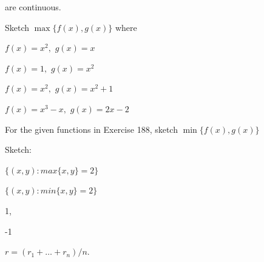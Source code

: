 \documentclass[11pt]{amsbook}
\begin{document}
\begin{hEnumerateArabic}
        are continuous.
        
        \item{ Sketch $\max{\{ f(x), g(x) \}}$ where}
        
            \begin{hEnumerateAlpha}
                \begin{multicols}{2}
                    \item $f(x) = x^2 ,$ $ g(x) = x$
                \columnbreak
                    \item $f(x) = 1 ,$ $ g(x) = x^2$
                \end{multicols}

                \begin{multicols}{2}
                    \item $f(x) = x^2 ,$ $ g(x) = x^2 + 1$
                \columnbreak
                    \item $f(x) = x^3 - x ,$ $ g(x) = 2x - 2$
                \end{multicols}
            \end{hEnumerateAlpha}
        
        \item{For the given functions in Exercise 188, sketch $\min{\{ f(x), g(x) \}}$ }
        
        \item{Sketch: }
            \begin{hEnumerateAlpha}
                \begin{multicols}{2}
                    \item $\{(x , y) : max{\{x,y\}} = 2\}$
                \columnbreak
                    \item $\{(x , y) : min{\{x,y\}} = 2\}$
                \end{multicols}
            \end{hEnumerateAlpha}
        
    \end{hEnumerateArabic}
\begin{hEnumerateArabic}
    \setcounter{enumi}{207}
    \item  
        \begin{hEnumerateAlpha}
            \begin{multicols}{2}
                \item 1,
                \columnbreak
                \item -1
            \end{multicols}
        \end{hEnumerateAlpha}
    \setcounter{enumi}{209}
    \item $ r = (r_1 + \ldots + r_n ) / n. $
\end{hEnumerateArabic}
\end{document}

